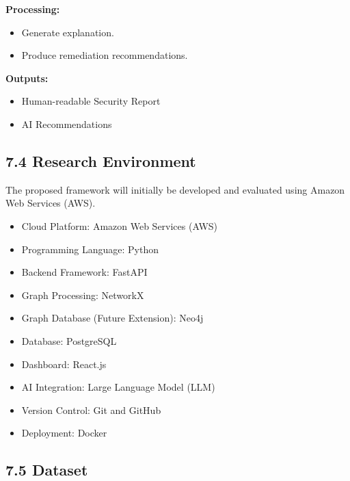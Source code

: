 \textbf{Processing:}

\begin{itemize}
\tightlist
\item
  Generate explanation.\\
\item
  Produce remediation recommendations.
\end{itemize}

\textbf{Outputs:}

\begin{itemize}
\tightlist
\item
  Human-readable Security Report\\
\item
  AI Recommendations
\end{itemize}

\subsection{7.4 Research Environment}

The proposed framework will initially be developed and evaluated using Amazon Web Services (AWS).

\begin{itemize}
\tightlist
\item
  Cloud Platform: Amazon Web Services (AWS)\\
\item
  Programming Language: Python\\
\item
  Backend Framework: FastAPI\\
\item
  Graph Processing: NetworkX\\
\item
  Graph Database (Future Extension): Neo4j\\
\item
  Database: PostgreSQL\\
\item
  Dashboard: React.js\\
\item
  AI Integration: Large Language Model (LLM)\\
\item
  Version Control: Git and GitHub\\
\item
  Deployment: Docker
\end{itemize}

\subsection{7.5 Dataset}

